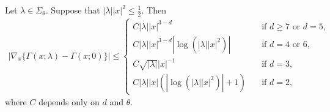   \begin{thm}
    \label{thm:differenceFundamentalSolutionStokes}
    Let $\lambda \in \Sigma_\theta$.
    Suppose that $|\lambda| |x|^2 \leq \frac{1}{2}$.
    Then
    \begin{align}
      |\nabla_x \{ \Gamma(x; \lambda) - \Gamma(x; 0) \} |
      \leq 
      \begin{cases}
        C |\lambda| |x|^{3 - d} &\quad\text{if } d \geq 7 \text{ or } d = 5, \\
        C |\lambda| |x|^{3 - d} | \log(|\lambda| |x|^2) | &\quad\text{if } d = 4 \text{ or } 6, \\
        C \sqrt{|\lambda|} |x|^{-1} &\quad\text{if } d = 3,\\
        C |\lambda| |x| ( |\log(|\lambda| |x|^2)| + 1 ) &\quad\text{if } d = 2,
      \end{cases}
    \end{align}
    where $C$ depends only on $d$ and $\theta$.
  \end{thm}


